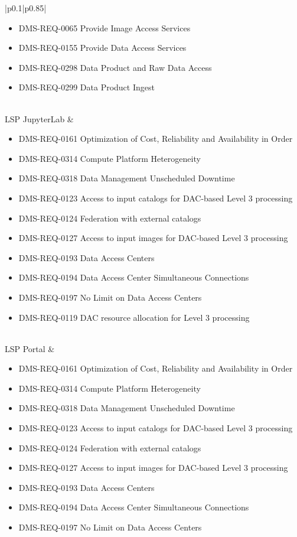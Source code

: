\documentclass[DM,lsstdraft,toc]{lsstdoc}
\begin{document}
\begin{xtabular}{|p{0.1\textwidth}|p{0.85\textwidth}|}
\begin{itemize}
\item DMS-REQ-0065 Provide Image Access Services
\item DMS-REQ-0155 Provide Data Access Services
\item DMS-REQ-0298 Data Product and Raw Data Access
\item DMS-REQ-0299 Data Product Ingest \end{itemize} \\ \hline
LSP JupyterLab &
\begin{itemize} \item DMS-REQ-0161 Optimization of Cost, Reliability and Availability in Order
\item DMS-REQ-0314 Compute Platform Heterogeneity
\item DMS-REQ-0318 Data Management Unscheduled Downtime
\item DMS-REQ-0123 Access to input catalogs for DAC-based Level 3 processing
\item DMS-REQ-0124 Federation with external catalogs
\item DMS-REQ-0127 Access to input images for DAC-based Level 3 processing
\item DMS-REQ-0193 Data Access Centers
\item DMS-REQ-0194 Data Access Center Simultaneous Connections
\item DMS-REQ-0197 No Limit on Data Access Centers
\item DMS-REQ-0119 DAC resource allocation for Level 3 processing \end{itemize} \\ \hline
LSP Portal &
\begin{itemize} \item DMS-REQ-0161 Optimization of Cost, Reliability and Availability in Order
\item DMS-REQ-0314 Compute Platform Heterogeneity
\item DMS-REQ-0318 Data Management Unscheduled Downtime
\item DMS-REQ-0123 Access to input catalogs for DAC-based Level 3 processing
\item DMS-REQ-0124 Federation with external catalogs
\item DMS-REQ-0127 Access to input images for DAC-based Level 3 processing
\item DMS-REQ-0193 Data Access Centers
\item DMS-REQ-0194 Data Access Center Simultaneous Connections
\item DMS-REQ-0197 No Limit on Data Access Centers

\end{itemize}
\end{xtabular}
\end{document}
